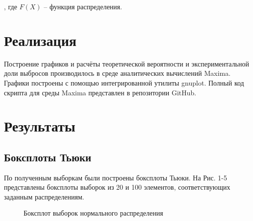 \documentclass[12pt]{article}
\begin{document}
\begin{flushleft}
\begin{itemize}
        \end{itemize}

        \noindent, где $F(X)$ -- функция распределения.

\newpage

\section{Реализация}

Построение графиков и расчёты теоретической вероятности и экспериментальной доли выбросов производилось в среде аналитических вычислений Maxima. Графики построены с помощью интегрированной утилиты gnuplot. Полный код скрипта для среды Maxima представлен в репозитории GitHub. 

\newpage

\section{Результаты}

    \subsection{Боксплоты Тьюки}

        По полученным выборкам были построены боксплоты Тьюки. На Рис. 1-5 представлены боксплоты выборок из 20 и 100 элементов, соответствующих заданным распределениям.
        
        \begin{figure}[h]
            \caption{Боксплот выборок нормального распределения}
        \end{figure}


\end{flushleft}
\end{document}
